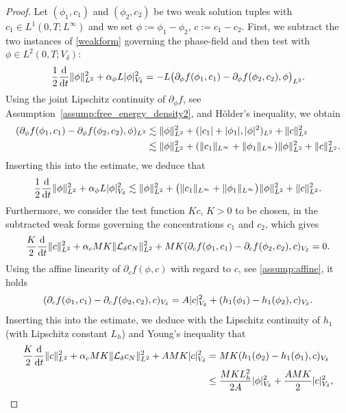 \documentclass[]{article}
\newcommand{\ddt}{\frac{\textup{d}}{\textup{d}t}}
\DeclarePairedDelimiter{\abs}{\lvert}{\rvert}
\DeclarePairedDelimiter{\norm}{\lVert}{\rVert}
\begin{document}
\begin{proof}
	Let $(\phi_1,c_1)$ and $(\phi_2,c_2)$ be two weak solution tuples with $c_1 \in L^1(0,T;L^\infty)$ and we set
	$\phi:=\phi_1-\phi_2$, $c:=c_1-c_2$.  
	First, we subtract the two instances of \eqref{weakform} governing the phase-field and then test with $\phi \in L^2(0,T;V_\delta)$:
	\[
	\dfrac12\ddt\norm{\phi}_{L^{2}}^{2}
	+\alpha_\phi L \abs{\phi}_{V_\delta}^2
	=-L \bigl(\partial_\phi f(\phi_1,c_1)
	-\partial_\phi f(\phi_2,c_2),\phi\bigr)_{L^2}.
	\]
	Using the joint Lipschitz continuity of $\partial_\phi f$, see Assumption~\ref{assump:free_energy_density2}, and Hölder’s inequality, we obtain 
	\begin{equation} \label{Eq:CritUni}
		\begin{aligned}
			(\partial_\phi f(\phi_1,c_1)
			-\partial_\phi f(\phi_2,c_2), \phi)_{L^2}  &\lesssim \norm{\phi}^2_{L^2} + (\abs{c_1}+\abs{\phi_1},\abs{\phi}^2)_{L^2}+ \norm{c}^2_{L^2} \\
			&\lesssim \norm{\phi}^2_{L^2} + (\norm{c_1}_{L^\infty}+\norm{\phi_1}_{L^\infty}) \norm{\phi}^2_{L^2}+ \norm{c}^2_{L^2}.
		\end{aligned}
	\end{equation}
	Inserting this into the estimate, we deduce that
	\begin{equation}\label{Eq:UniqueEst1}
		\dfrac12\ddt\norm{\phi}_{L^{2}}^{2}
		+\alpha_\phi L\abs{\phi}_{V_\delta}^2
		\lesssim \norm{\phi}^2_{L^2} + \big(\norm{c_1}_{L^\infty}+\norm{\phi_1}_{L^\infty}\big) \norm{\phi}^2_{L^2}+ \norm{c}^2_{L^2}.
	\end{equation}
	Furthermore, we consider the test function $Kc$, $K>0$ to be chosen, in the subtracted weak forms governing the concentrations $c_1$ and $c_2$, which gives
	$$\frac{K}{2} \ddt \norm{c}_{L^2}^2 +\alpha_c MK \norm{\mathcal{L}_\delta c_N}_{L^2}^2+ MK(\partial_c f(\phi_1,c_1)-\partial_c f(\phi_2,c_2),c)_{V_\delta} = 0.$$
	Using the affine linearity of $\partial_c f(\phi,c)$ with regard to $c$, see \eqref{assump:affine}, it holds
	$$(\partial_c f(\phi_1,c_1)-\partial_c f(\phi_2,c_2),c)_{V_\delta} =A\abs{c}_{V_\delta}^2 + (h_1(\phi_1)-h_1(\phi_2),c)_{V_\delta}.$$
	Inserting this into the estimate, we deduce with the Lipschitz continuity of $h_1$ (with Lipschitz constant $L_h$) and Young's inequality that
	$$
	\begin{aligned}\frac{K}{2} \ddt \norm{c}_{L^2}^2 +\alpha_c MK \norm{\mathcal{L}_\delta c_N}_{L^2}^2+ AMK\abs{c}_{V_\delta}^2 &= MK(h_1(\phi_2)-h_1(\phi_1),c)_{V_\delta} \\ &\leq \frac{MKL_h^2}{2A}\abs{\phi}_{V_\delta}^2 + \frac{AMK}{2} \abs{c}_{V_\delta}^2,

\end{aligned}$$
\end{proof}
\end{document}

